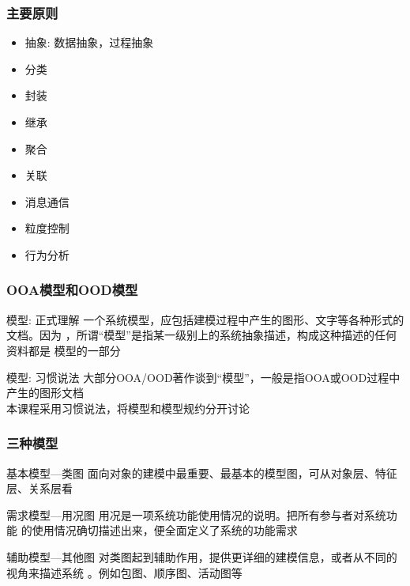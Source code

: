 \documentclass[compress]{beamer}
\begin{document}
\begin{frame}
  \frametitle{主要原则}
  \begin{itemize}
    \item 抽象: 数据抽象，过程抽象
    \item 分类
    \item 封装
    \item 继承
    \item 聚合
    \item 关联
    \item 消息通信
    \item 粒度控制
    \item 行为分析
  \end{itemize}
\end{frame}

\begin{frame}
  \frametitle{OOA模型和OOD模型}
  \begin{block}{模型: 正式理解}
    一个系统模型，应包括建模过程中产生的图形、文字等各种形式的文档。因为
    ，所谓“模型”是指某一级别上的系统抽象描述，构成这种描述的任何资料都是
    模型的一部分
  \end{block}
  \begin{block}{模型: 习惯说法}
    大部分OOA/OOD著作谈到“模型”，一般是指OOA或OOD过程中产生的图形文档 \\
    本课程采用习惯说法，将模型和模型规约分开讨论
  \end{block}

\end{frame}

\begin{frame}
  \frametitle{三种模型}
  \begin{block}{基本模型---类图}
    面向对象的建模中最重要、最基本的模型图，可从对象层、特征层、关系层看
  \end{block}
  \begin{block}{需求模型---用况图}
    用况是一项系统功能使用情况的说明。把所有参与者对系统功能
    的使用情况确切描述出来，便全面定义了系统的功能需求
  \end{block}
  \begin{block}{辅助模型---其他图}
    对类图起到辅助作用，提供更详细的建模信息，或者从不同的视角来描述系统
    。例如包图、顺序图、活动图等
  \end{block}
\end{frame}
\end{document}
